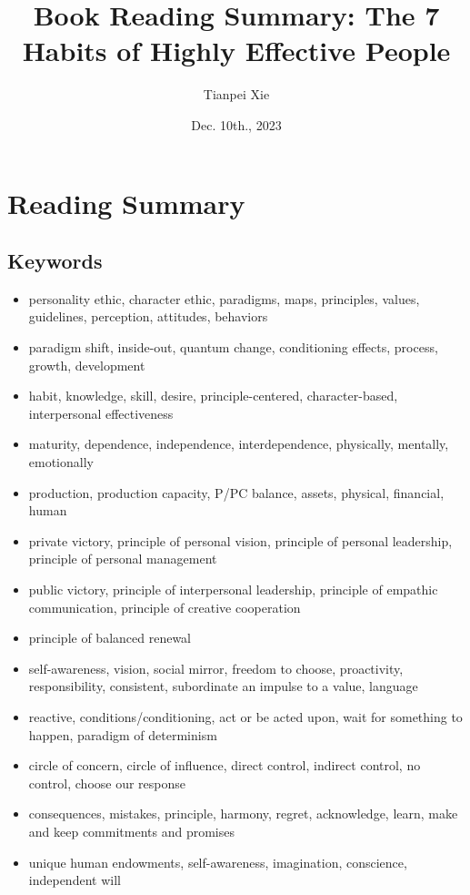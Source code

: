 \documentclass[11pt]{article}
\begin{document}
\title{Book Reading Summary: The 7 Habits of Highly Effective People}
\author{ Tianpei Xie}
\date{Dec. 10th., 2023}
\maketitle
\tableofcontents
\newpage
\section{Reading Summary}
\subsection{Keywords}
\begin{itemize}
\item personality ethic, character ethic, paradigms, maps, principles, values, guidelines,  perception, attitudes, behaviors
\item paradigm shift, inside-out, quantum change, conditioning effects, process,  growth, development
\item habit, knowledge, skill, desire,  principle-centered, character-based, interpersonal effectiveness
\item maturity, dependence, independence, interdependence, physically, mentally, emotionally
\item production, production capacity, P/PC balance, assets, physical, financial, human
\item private victory, principle of personal vision, principle of personal leadership, principle of personal management 
\item public victory, principle of interpersonal leadership, principle of empathic communication, principle of creative cooperation
\item principle of balanced renewal
\item self-awareness, vision, social mirror, freedom to choose, proactivity, responsibility, consistent, subordinate an impulse to a value, language
\item reactive, conditions/conditioning,  act or be acted upon, wait for something to happen, paradigm of determinism
\item circle of concern, circle of influence, direct control, indirect control, no control, choose our response
\item consequences, mistakes, principle, harmony, regret, acknowledge, learn, make and keep commitments and promises
\item unique human endowments, self-awareness, imagination, conscience, independent will

\end{itemize}
\end{document}
